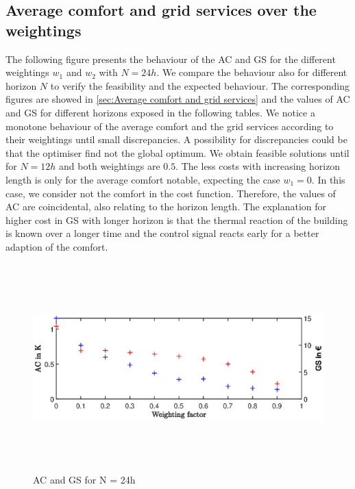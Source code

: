 \subsection{Average comfort and grid services over the weightings}
\label{subsec:Average comfort and grid services over the weightings}
The following figure presents the behaviour of the AC and GS for the different weightings $w_\text{1}$ and $w_\text{2}$ with $N = 24h$. We compare the behaviour also for different horizon $N$ to verify the feasibility and the expected behaviour. The corresponding figures are showed in \autoref{sec:Average comfort and grid services} and the values of AC and GS for different horizons exposed in the following tables.\newline
We notice a monotone behaviour of the average comfort and the grid services according to their weightings until small discrepancies. A possibility for discrepancies could be that the optimiser find not the global optimum. We obtain feasible solutions until for $N=12 h$ and both weightings are $0.5$. The less costs with increasing horizon length is only for the average comfort notable, expecting the case $w_\text{1}=0$. In this case, we consider not the comfort in the cost function. Therefore, the values of AC are coincidental, also relating to the horizon length.\newline
The explanation for higher cost in GS with longer horizon is that the thermal reaction of the building is known over a longer time and the control signal reacts early for a better adaption of the comfort.
    \begin{figure}[H]
            \centering
            \includegraphics[width=15cm,height=8cm]{figure/AC_und_GS_24h.eps}
           \caption{AC and GS for N = 24h}
            \label{fig:AC_und_GS_24h}
    \end{figure}
    

